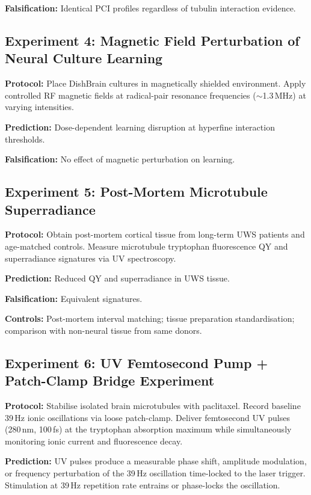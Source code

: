 \documentclass[10pt, a4paper, twocolumn]{article}
\begin{document}
\textbf{Falsification:} Identical PCI profiles regardless of tubulin
interaction evidence.

\subsection{Experiment 4: Magnetic Field Perturbation of Neural Culture
Learning}

\textbf{Protocol:} Place DishBrain cultures in magnetically shielded
environment. Apply controlled RF magnetic fields at radical-pair
resonance frequencies ($\sim$1.3\,MHz) at varying intensities.

\textbf{Prediction:} Dose-dependent learning disruption at hyperfine
interaction thresholds.

\textbf{Falsification:} No effect of magnetic perturbation on learning.

\subsection{Experiment 5: Post-Mortem Microtubule Superradiance}

\textbf{Protocol:} Obtain post-mortem cortical tissue from long-term
UWS patients and age-matched controls. Measure microtubule tryptophan
fluorescence QY and superradiance signatures via UV spectroscopy.

\textbf{Prediction:} Reduced QY and superradiance in UWS tissue.

\textbf{Falsification:} Equivalent signatures.

\textbf{Controls:} Post-mortem interval matching; tissue preparation
standardisation; comparison with non-neural tissue from same donors.

\subsection{Experiment 6: UV Femtosecond Pump + Patch-Clamp Bridge
Experiment}

\textbf{Protocol:} Stabilise isolated brain microtubules with
paclitaxel. Record baseline 39\,Hz ionic oscillations via loose
patch-clamp. Deliver femtosecond UV pulses (280\,nm, 100\,fs) at the
tryptophan absorption maximum while simultaneously monitoring ionic
current and fluorescence decay.

\textbf{Prediction:} UV pulses produce a measurable phase shift,
amplitude modulation, or frequency perturbation of the 39\,Hz
oscillation time-locked to the laser trigger. Stimulation at 39\,Hz
repetition rate entrains or phase-locks the oscillation.
\end{document}
